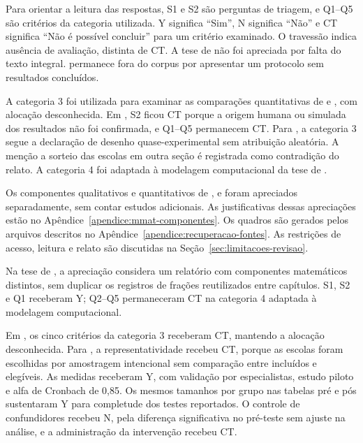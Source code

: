 Para orientar a leitura das respostas, S1 e S2 são perguntas de triagem, e Q1--Q5 são critérios da categoria utilizada. Y significa ``Sim'', N significa ``Não'' e CT significa ``Não é possível concluir'' para um critério examinado. O travessão indica ausência de avaliação, distinta de CT. A tese de  não foi apreciada por falta do texto integral.  permanece fora do corpus por apresentar um protocolo sem resultados concluídos.

A categoria 3 foi utilizada para examinar as comparações quantitativas de  e , com alocação desconhecida. Em , S2 ficou CT porque a origem humana ou simulada dos resultados não foi confirmada, e Q1--Q5 permanecem CT. Para , a categoria 3 segue a declaração de desenho quase-experimental sem atribuição aleatória. A menção a sorteio das escolas em outra seção é registrada como contradição do relato. A categoria 4 foi adaptada à modelagem computacional da tese de .

Os componentes qualitativos e quantitativos de ,  e  foram apreciados separadamente, sem contar estudos adicionais. As justificativas dessas apreciações estão no Apêndice~\ref{apendice:mmat-componentes}. Os quadros são gerados pelos arquivos descritos no Apêndice~\ref{apendice:recuperacao-fontes}. As restrições de acesso, leitura e relato são discutidas na Seção~\ref{sec:limitacoes-revisao}.



Na tese de , a apreciação considera um relatório com componentes matemáticos distintos, sem duplicar os registros de frações reutilizados entre capítulos. S1, S2 e Q1 receberam Y; Q2--Q5 permaneceram CT na categoria 4 adaptada à modelagem computacional.

Em , os cinco critérios da categoria 3 receberam CT, mantendo a alocação desconhecida. Para , a representatividade recebeu CT, porque as escolas foram escolhidas por amostragem intencional sem comparação entre incluídos e elegíveis. As medidas receberam Y, com validação por especialistas, estudo piloto e alfa de Cronbach de 0,85. Os mesmos tamanhos por grupo nas tabelas pré e pós sustentaram Y para completude dos testes reportados. O controle de confundidores recebeu N, pela diferença significativa no pré-teste sem ajuste na análise, e a administração da intervenção recebeu CT.

